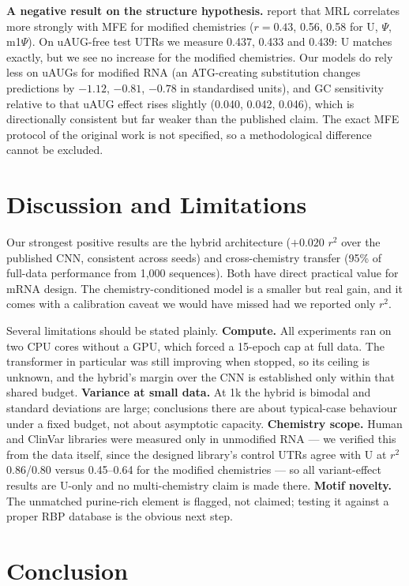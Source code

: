 \documentclass{article}
\begin{document}
\textbf{A negative result on the structure hypothesis.} \citet{sample2019} report that MRL
correlates more strongly with MFE for modified chemistries ($r = 0.43$, 0.56, 0.58 for U,
$\Psi$, m1$\Psi$). On uAUG-free test UTRs we measure 0.437, 0.433 and 0.439: U matches
exactly, but we see no increase for the modified chemistries. Our models do rely less on
uAUGs for modified RNA (an ATG-creating substitution changes predictions by $-1.12$, $-0.81$,
$-0.78$ in standardised units), and GC sensitivity relative to that uAUG effect rises
slightly (0.040, 0.042, 0.046), which is directionally consistent but far weaker than the
published claim. The exact MFE protocol of the original work is not specified, so a
methodological difference cannot be excluded.

\section{Discussion and Limitations}

Our strongest positive results are the hybrid architecture ($+0.020$ $r^2$ over the published
CNN, consistent across seeds) and cross-chemistry transfer (95\% of full-data performance
from 1{,}000 sequences). Both have direct practical value for mRNA design. The
chemistry-conditioned model is a smaller but real gain, and it comes with a calibration
caveat we would have missed had we reported only $r^2$.

Several limitations should be stated plainly. \textbf{Compute.} All experiments ran on two
CPU cores without a GPU, which forced a 15-epoch cap at full data. The transformer in
particular was still improving when stopped, so its ceiling is unknown, and the hybrid's
margin over the CNN is established only within that shared budget. \textbf{Variance at small
data.} At 1k the hybrid is bimodal and standard deviations are large; conclusions there are
about typical-case behaviour under a fixed budget, not about asymptotic capacity.
\textbf{Chemistry scope.} Human and ClinVar libraries were measured only in unmodified RNA
--- we verified this from the data itself, since the designed library's control UTRs agree
with U at $r^2$ 0.86/0.80 versus 0.45--0.64 for the modified chemistries --- so all
variant-effect results are U-only and no multi-chemistry claim is made there.
\textbf{Motif novelty.} The unmatched purine-rich element is flagged, not claimed; testing it
against a proper RBP database is the obvious next step.

\section{Conclusion}
\end{document}
